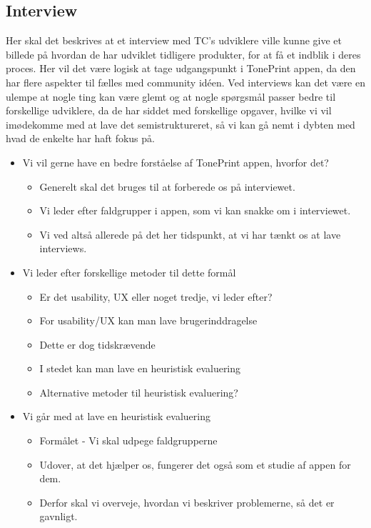 \subsection*{Interview}
\label{MethodInterview}
Her skal det beskrives at et interview med TC's udviklere ville kunne give et billede på hvordan de har udviklet tidligere produkter, for at få et indblik i deres proces. Her vil det være logisk at tage udgangspunkt i TonePrint appen, da den har flere aspekter til fælles med community idéen. Ved interviews kan det være en ulempe at nogle ting kan være glemt og at nogle spørgsmål passer bedre til forskellige udviklere, da de har siddet med forskellige opgaver, hvilke vi vil imødekomme med at lave det semistruktureret, så vi kan gå nemt i dybten med hvad de enkelte har haft fokus på. 

\begin{itemize}
	\item Vi vil gerne have en bedre forståelse af TonePrint appen, hvorfor det?
	\begin{itemize}
		\item Generelt skal det bruges til at forberede os på interviewet.
		\item Vi leder efter faldgrupper i appen, som vi kan snakke om i interviewet.
		\item Vi ved altså allerede på det her tidspunkt, at vi har tænkt os at lave interviews.
	\end{itemize}
	\item Vi leder efter forskellige metoder til dette formål
	\begin{itemize}
		\item Er det usability, UX eller noget tredje, vi leder efter?
		\item For usability/UX kan man lave brugerinddragelse
		\item Dette er dog tidskrævende
		\item I stedet kan man lave en heuristisk evaluering
		\item Alternative metoder til heuristisk evaluering?
	\end{itemize}
	\item Vi går med at lave en heuristisk evaluering
	\begin{itemize}
		\item Formålet - Vi skal udpege faldgrupperne
		\item Udover, at det hjælper os, fungerer det også som et studie af appen for dem.
		\item Derfor skal vi overveje, hvordan vi beskriver problemerne, så det er gavnligt.

\end{itemize}
\end{itemize}
